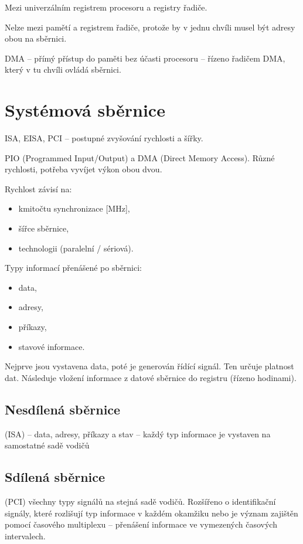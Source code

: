 \documentclass[a4wide]{report}
\begin{document}
Mezi univerzálním registrem procesoru a registry řadiče.

Nelze mezi pamětí a registrem řadiče, protože by v jednu chvíli musel být adresy obou na sběrnici.

DMA -- přímý přístup do paměti bez účasti procesoru -- řízeno řadičem DMA, který v tu chvíli ovládá sběrnici.

\section{Systémová sběrnice}

ISA, EISA, PCI -- postupné zvyšování rychlosti a šířky.

PIO (Programmed Input/Output) a DMA (Direct Memory Access). Různé rychlosti, potřeba vyvíjet výkon obou dvou.

Rychlost závisí na:
\begin{itemize}
	\item kmitočtu synchronizace [MHz],
	\item šířce sběrnice,
	\item technologii (paralelní / sériová).
\end{itemize}

Typy informací přenášené po sběrnici:
\begin{itemize}
	\item data,
	\item adresy,
	\item příkazy,
	\item stavové informace.
\end{itemize}

Nejprve jsou vystavena data, poté je generován řídící signál. Ten určuje platnost dat. Následuje vložení informace z datové sběrnice do registru (řízeno hodinami).

\subsection{Nesdílená sběrnice}
(ISA) -- data, adresy, příkazy a stav -- každý typ informace je vystaven na samostatné sadě vodičů

\subsection{Sdílená sběrnice}
(PCI) všechny typy signálů na stejná sadě vodičů. Rozšířeno o identifikační signály, které rozlišují typ informace v každém okamžiku nebo je význam zajištěn pomocí časového multiplexu -- přenášení informace ve vymezených časových intervalech.
\end{document}
